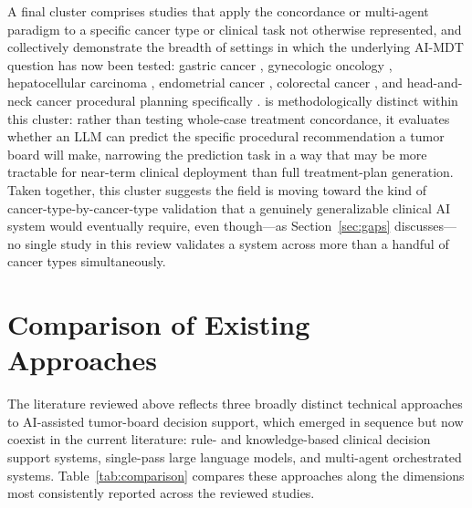 \documentclass{article}
\begin{document}
A final cluster comprises studies that apply the concordance or multi-agent paradigm to a specific cancer type or clinical task not otherwise represented, and collectively demonstrate the breadth of settings in which the underlying AI-MDT question has now been tested: gastric cancer \cite{park2023}, gynecologic oncology \cite{kuerbanjiang2025}, hepatocellular carcinoma \cite{saenz2026,ciulli2026}, endometrial cancer \cite{aliyev2026}, colorectal cancer \cite{chatziisaak2025}, and head-and-neck cancer procedural planning specifically \cite{aubreville2024}. \citet{aubreville2024} is methodologically distinct within this cluster: rather than testing whole-case treatment concordance, it evaluates whether an LLM can predict the specific procedural recommendation a tumor board will make, narrowing the prediction task in a way that may be more tractable for near-term clinical deployment than full treatment-plan generation. Taken together, this cluster suggests the field is moving toward the kind of cancer-type-by-cancer-type validation that a genuinely generalizable clinical AI system would eventually require, even though---as Section~\ref{sec:gaps} discusses---no single study in this review validates a system across more than a handful of cancer types simultaneously.

\section{Comparison of Existing Approaches}
\label{sec:comparison}

The literature reviewed above reflects three broadly distinct technical approaches to AI-assisted tumor-board decision support, which emerged in sequence but now coexist in the current literature: rule- and knowledge-based clinical decision support systems, single-pass large language models, and multi-agent orchestrated systems. Table~\ref{tab:comparison} compares these approaches along the dimensions most consistently reported across the reviewed studies.
\end{document}
